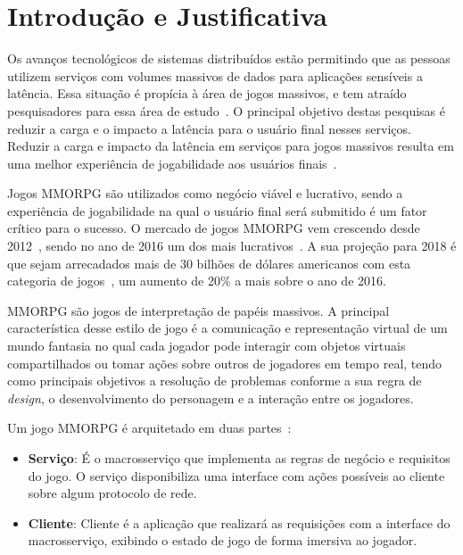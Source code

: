 \section{Introdução e Justificativa}
\label{sec:int}

Os avanços tecnológicos de sistemas distribuídos estão permitindo que as pessoas utilizem serviços com volumes massivos de dados para aplicações sensíveis a latência.
%
Essa situação é propícia à área de jogos massivos, e tem atraído pesquisadores para essa área de estudo~\cite{mmo_analytic,1417630,6267019,6063041}.
%
O principal objetivo destas pesquisas é reduzir a carga e o impacto a latência para o usuário final nesses serviços.
%
Reduzir a carga e impacto da latência em serviços para jogos massivos resulta em uma melhor experiência de jogabilidade aos usuários finais~\cite{1417630}.


Jogos \ac{MMORPG} são utilizados como negócio viável e lucrativo, sendo a experiência de jogabilidade na qual o usuário final será submitido é um fator crítico para o sucesso.
%
O mercado de jogos \ac{MMORPG} vem crescendo desde 2012~\cite{new_york_times}, sendo no ano de 2016 um dos mais lucrativos~\cite{statista_2016}.
%
A sua projeção para 2018 é que sejam arrecadados mais de 30 bilhões de dólares americanos com esta categoria de jogos~\cite{statista_2018}, um aumento de 20\% a mais sobre o ano de 2016.



\ac{MMORPG} são jogos de interpretação de papéis massivos.
%
A principal característica desse estilo de jogo é a comunicação e representação virtual de um mundo fantasia no qual cada jogador pode interagir com objetos virtuais compartilhados ou tomar ações sobre outros de jogadores em tempo real, tendo como principais objetivos a resolução de problemas conforme a sua regra de \textit{design}, o desenvolvimento do personagem e a interação entre os jogadores\cite{video_game_technologies}.
%

Um jogo \ac{MMORPG} é arquitetado em duas partes~\cite{mmo_analytic}:
\begin{itemize}
  \item \textbf{Serviço}: É o macrosserviço que implementa as regras de negócio e requisitos do jogo.
  O serviço disponibiliza uma interface com ações possíveis ao cliente sobre algum protocolo de rede.
  \item \textbf{Cliente}: Cliente é a aplicação que realizará as requisições com a interface do macrosserviço, exibindo o estado de jogo de forma imersiva ao jogador.
\end{itemize}

